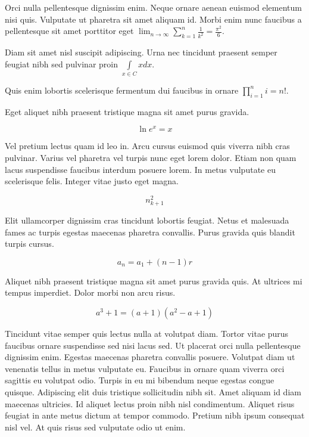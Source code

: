 \documentclass{article}
\begin{document}
	
    Orci nulla pellentesque dignissim enim. Neque ornare aenean euismod elementum nisi quis. Vulputate ut pharetra sit amet aliquam id. Morbi enim nunc faucibus a pellentesque sit amet porttitor eget  \begin{math}
    	\lim_{n \to \infty}\sum_{k=1}^n \frac{1}{k^2}= \frac{\pi^2}{6}
    \end{math}.
    \newline
    
   Diam sit amet nisl suscipit adipiscing. Urna nec tincidunt praesent semper feugiat nibh sed pulvinar proin $ \int\limits_{x\in C}xdx $.
   \newline
    
    Quis enim lobortis scelerisque fermentum dui faucibus in ornare \( \prod_{i=1}^ni=n! \).
    \newline
    
    Eget aliquet nibh praesent tristique magna sit amet purus gravida.
    
    \[ \ln e^x = x  \]
    
    Vel pretium lectus quam id leo in. Arcu cursus euismod quis viverra nibh cras pulvinar. Varius vel pharetra vel turpis nunc eget lorem dolor. Etiam non quam lacus suspendisse faucibus interdum posuere lorem. In metus vulputate eu scelerisque felis. Integer vitae justo eget magna.
    
    $$ n_{k+1}^2 $$
    
    Elit ullamcorper dignissim cras tincidunt lobortis feugiat. Netus et malesuada fames ac turpis egestas maecenas pharetra convallis. Purus gravida quis blandit turpis cursus. 
    
    \begin{displaymath}
    	a_{n}=a_{1}+(n-1)r
    \end{displaymath}
    
    Aliquet nibh praesent tristique magna sit amet purus gravida quis. At ultrices mi tempus imperdiet. Dolor morbi non arcu risus.
    
    \begin{equation}
    	a^{3}+1=(a+1)(a^{2}-a+1)
    \end{equation}
    
    Tincidunt vitae semper quis lectus nulla at volutpat diam. Tortor vitae purus faucibus ornare suspendisse sed nisi lacus sed. Ut placerat orci nulla pellentesque dignissim enim. Egestas maecenas pharetra convallis posuere. Volutpat diam ut venenatis tellus in metus vulputate eu. Faucibus in ornare quam viverra orci sagittis eu volutpat odio. Turpis in eu mi bibendum neque egestas congue quisque. Adipiscing elit duis tristique sollicitudin nibh sit. Amet aliquam id diam maecenas ultricies. Id aliquet lectus proin nibh nisl condimentum. Aliquet risus feugiat in ante metus dictum at tempor commodo. Pretium nibh ipsum consequat nisl vel. At quis risus sed vulputate odio ut enim.
    
\end{document}
